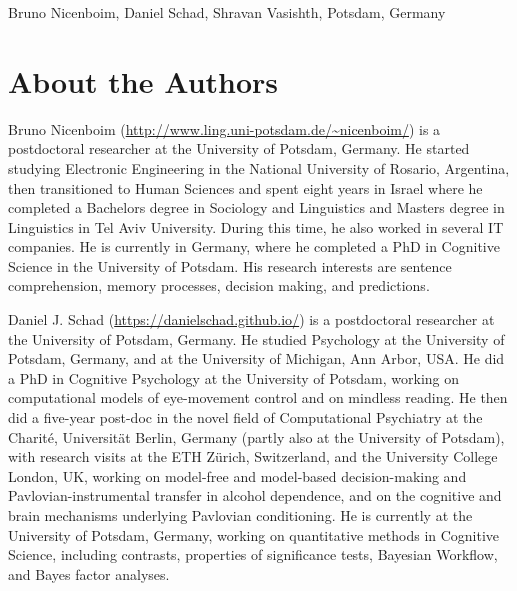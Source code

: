 \documentclass[12pt,]{krantz}
\theoremstyle{definition}
\theoremstyle{definition}
\theoremstyle{definition}
\theoremstyle{remark}
\let\BeginKnitrBlock\begin \let\EndKnitrBlock\end
\begin{document}
\BeginKnitrBlock{flushright}
Bruno Nicenboim,
Daniel Schad,
Shravan Vasishth,
Potsdam, Germany
\EndKnitrBlock{flushright}

\hypertarget{about-the-authors}{%
\chapter*{About the Authors}\label{about-the-authors}}


Bruno Nicenboim (\url{http://www.ling.uni-potsdam.de/~nicenboim/}) is a postdoctoral researcher at the University of Potsdam, Germany. He started studying Electronic Engineering in the National University of Rosario, Argentina, then transitioned to Human Sciences and spent eight years in Israel where he completed a Bachelors degree in Sociology and Linguistics and Masters degree in Linguistics in Tel Aviv University. During this time, he also worked in several IT companies. He is currently in Germany, where he completed a PhD in Cognitive Science in the University of Potsdam. His research interests are sentence comprehension, memory processes, decision making, and predictions.

Daniel J. Schad (\url{https://danielschad.github.io/}) is a postdoctoral researcher at the University of Potsdam, Germany. He studied Psychology at the University of Potsdam, Germany, and at the University of Michigan, Ann Arbor, USA. He did a PhD in Cognitive Psychology at the University of Potsdam, working on computational models of eye-movement control and on mindless reading. He then did a five-year post-doc in the novel field of Computational Psychiatry at the Charité, Universität Berlin, Germany (partly also at the University of Potsdam), with research visits at the ETH Zürich, Switzerland, and the University College London, UK, working on model-free and model-based decision-making and Pavlovian-instrumental transfer in alcohol dependence, and on the cognitive and brain mechanisms underlying Pavlovian conditioning. He is currently at the University of Potsdam, Germany, working on quantitative methods in Cognitive Science, including contrasts, properties of significance tests, Bayesian Workflow, and Bayes factor analyses.
\end{document}

